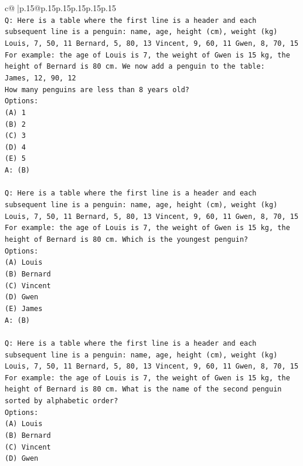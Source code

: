 \documentclass{article}
\begin{document}
{\begin{supertabular}{c@{$\;$}|p{.15\linewidth}@{}p{.15\linewidth}p{.15\linewidth}p{.15\linewidth}p{.15\linewidth}p{.15\linewidth}}
{{{\\ 
\texttt{Q: Here is a table where the first line is a header and each subsequent line is a penguin:  name, age, height (cm), weight (kg) Louis, 7, 50, 11 Bernard, 5, 80, 13 Vincent, 9, 60, 11 Gwen, 8, 70, 15  For example: the age of Louis is 7, the weight of Gwen is 15 kg, the height of Bernard is 80 cm.  We now add a penguin to the table:} \\
\texttt{James, 12, 90, 12} \\
\texttt{How many penguins are less than 8 years old?} \\
\texttt{Options:} \\
\texttt{(A) 1} \\
\texttt{(B) 2} \\
\texttt{(C) 3} \\
\texttt{(D) 4} \\
\texttt{(E) 5} \\
\texttt{A: (B)} \\
\\ 
\texttt{Q: Here is a table where the first line is a header and each subsequent line is a penguin:  name, age, height (cm), weight (kg) Louis, 7, 50, 11 Bernard, 5, 80, 13 Vincent, 9, 60, 11 Gwen, 8, 70, 15  For example: the age of Louis is 7, the weight of Gwen is 15 kg, the height of Bernard is 80 cm.  Which is the youngest penguin?} \\
\texttt{Options:} \\
\texttt{(A) Louis} \\
\texttt{(B) Bernard} \\
\texttt{(C) Vincent} \\
\texttt{(D) Gwen} \\
\texttt{(E) James} \\
\texttt{A: (B)} \\
\\ 
\texttt{Q: Here is a table where the first line is a header and each subsequent line is a penguin:  name, age, height (cm), weight (kg) Louis, 7, 50, 11 Bernard, 5, 80, 13 Vincent, 9, 60, 11 Gwen, 8, 70, 15  For example: the age of Louis is 7, the weight of Gwen is 15 kg, the height of Bernard is 80 cm.  What is the name of the second penguin sorted by alphabetic order?} \\
\texttt{Options:} \\
\texttt{(A) Louis} \\
\texttt{(B) Bernard} \\
\texttt{(C) Vincent} \\
\texttt{(D) Gwen} \\
}}}
\end{supertabular}}
\end{document}
